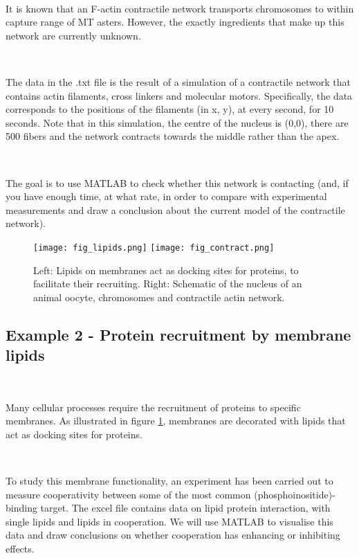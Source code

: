 \documentclass[11pt]{amsart}
\begin{document}
\

It is known that an F-actin contractile network transports chromosomes to within capture range of MT asters. However, the exactly ingredients that make up this network are currently unknown.

\

The data in the .txt file is the result of a simulation of a contractile network that contains actin filaments, cross linkers and molecular motors. Specifically, the data corresponds to the  positions of the filaments (in x, y), at every second, for 10 seconds. Note that in this simulation, the centre of the nucleus is (0,0), there are 500 fibers and the network contracts towards the middle rather than the apex.

\

The goal is to use MATLAB to check whether this network is contacting (and, if you have enough time, at what rate, in order to compare with experimental measurements and draw a conclusion about the current model of the contractile network).

\begin{figure}[h]
\centering
\caption{Left: Lipids on membranes act as docking sites for proteins, to facilitate their recruiting. Right: Schematic of the nucleus of an animal oocyte, chromosomes and contractile actin network.}
\label{fig_lipids}
	 \texttt{[image: fig\_lipids.png]} \hspace{1cm}
	 \texttt{[image: fig\_contract.png]}
\end{figure}


\subsection*{Example 2 - Protein recruitment by membrane lipids}

\

Many cellular processes require the recruitment of proteins to specific membranes. As illustrated in figure \ref{fig_lipids}, membranes are decorated with lipids that act as docking sites for proteins. 

\

To study this membrane functionality, an experiment has been carried out to measure cooperativity between some of the most common (phosphoinositide)-binding target. The excel file contains data on lipid protein interaction, with single lipids and lipids in cooperation. We will use MATLAB to visualise this data and draw conclusions on whether cooperation has enhancing or inhibiting effects.
\end{document}

